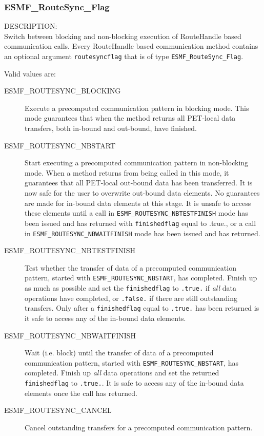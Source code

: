 \subsubsection{ESMF\_RouteSync\_Flag}
\label{opt:routesyncflag}
{\sf DESCRIPTION:\\}  
Switch between blocking and non-blocking execution of RouteHandle based
communication calls. Every RouteHandle based communication method contains
an optional argument {\tt routesyncflag} that is of type {\tt ESMF\_RouteSync\_Flag}.

Valid values are:
\begin{description}

\item [ESMF\_ROUTESYNC\_BLOCKING]
         Execute a precomputed communication pattern in blocking mode. This
         mode guarantees that when the method returns all PET-local data
         transfers, both in-bound and out-bound, have finished. 
\item [ESMF\_ROUTESYNC\_NBSTART]
         \begin{sloppypar}
         Start executing a precomputed communication pattern in non-blocking
         mode. When a method returns from being called in this mode, it
         guarantees that all PET-local out-bound data has been transferred.
         It is now safe for the user to overwrite out-bound data elements.
         No guarantees are made for in-bound data elements at this stage. It is
         unsafe to access these elements until a call in
         {\tt ESMF\_ROUTESYNC\_NBTESTFINISH} mode has been issued and has returned
         with {\tt finishedflag} equal to .true., or a call in
         {\tt ESMF\_ROUTESYNC\_NBWAITFINISH} mode has been issued and has returned.
         \end{sloppypar}
\item [ESMF\_ROUTESYNC\_NBTESTFINISH]
         Test whether the transfer of data of a precomputed communication
         pattern, started with {\tt ESMF\_ROUTESYNC\_NBSTART}, has completed.
         Finish up as much as possible and set the {\tt finishedflag} to 
         {\tt .true.} if {\em all} data operations have completed, or
         {\tt .false.} if there are still outstanding transfers. Only after
         a {\tt finishedflag} equal to {\tt .true.} has been returned is it
         safe to access any of the in-bound data elements.
\item [ESMF\_ROUTESYNC\_NBWAITFINISH]
         Wait (i.e. block) until the transfer of data of a precomputed
         communication pattern, started with {\tt ESMF\_ROUTESYNC\_NBSTART}, has
         completed. Finish up {\em all} data operations and set the returned 
         {\tt finishedflag} to {\tt .true.}. It is safe to access any of the
         in-bound data elements once the call has returned.
\item [ESMF\_ROUTESYNC\_CANCEL]
         Cancel outstanding transfers for a precomputed communication pattern.
\end{description}

